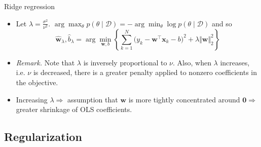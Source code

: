 \documentclass{beamer}
\numberwithin{equation}{section}
\begin{document}
\begin{frame}{Ridge regression}
    \begin{itemize}
        \item
        Let $ \lambda = \frac{\sigma^2}{\nu^2} $. $ \arg\max_\theta
        p(\theta \mid \mathcal{D}) =
        -\arg\min_\theta\log p(\theta \mid \mathcal{D}) $ and so
        \begin{equation}
            \hat{\mathbf{w}}_\lambda, \hat{b}_\lambda =
            \arg\min_{\mathbf{w}, b}\left\{\sum_{k = 1}^N
            \big(y_k - \mathbf{w}^\top\mathbf{x}_k - b\big)^2 +
            \lambda\Vert\mathbf{w}\Vert_2^2\right\}
        \end{equation}

        \item
        \textit{Remark.} Note that $ \lambda $ is inversely proportional to
        $ \nu $. Also, when $ \lambda $ increases, i.e. $ \nu $ is decreased,
        there is a greater penalty applied to nonzero coefficients in the
        objective.

        \item
        Increasing $ \lambda \Rightarrow $ assumption that $ \mathbf{w} $ is
        more tightly concentrated around $ \mathbf{0} \Rightarrow $ greater
        shrinkage of OLS coefficients.
    \end{itemize}
\end{frame}

\subsection{Regularization}
\end{document}
